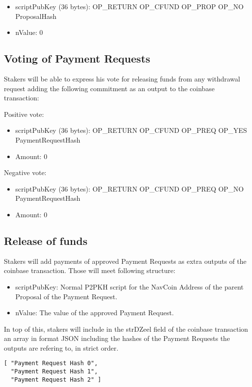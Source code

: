 \documentclass{artikel1}
\begin{document}
\begin{flushleft}
\begin{itemize}
\item scriptPubKey (36 bytes): OP\_RETURN OP\_CFUND OP\_PROP OP\_NO ProposalHash
\item nValue: 0
\end{itemize}

\subsection{Voting of Payment Requests}
Stakers will be able to express his vote for releasing funds from any withdrawal request adding the following commitment as an output to the coinbase transaction:

Positive vote:
\begin{itemize}
\item scriptPubKey (36 bytes): OP\_RETURN OP\_CFUND OP\_PREQ OP\_YES PaymentRequestHash
\item Amount: 0
\end{itemize}

Negative vote:
\begin{itemize}
\item scriptPubKey (36 bytes): OP\_RETURN OP\_CFUND OP\_PREQ OP\_NO PaymentRequestHash
\item Amount: 0
\end{itemize}

\subsection{Release of funds}

Stakers will add payments of approved Payment Requests as extra outputs of the coinbase transaction. Those will meet following structure:

\begin{itemize}
	\item scriptPubKey: Normal P2PKH script for the NavCoin Address of the parent Proposal of the Payment Request.
	\item nValue: The value of the approved Payment Request.
\end{itemize}

In top of this, stakers will include in the strDZeel field of the coinbase transaction an array in format JSON including the hashes of the Payment Requests the outputs are refering to, in strict order.

\begin{lstlisting}
[ "Payment Request Hash 0",
  "Payment Request Hash 1",
  "Payment Request Hash 2" ]
\end{lstlisting}


\end{flushleft}
\end{document}
